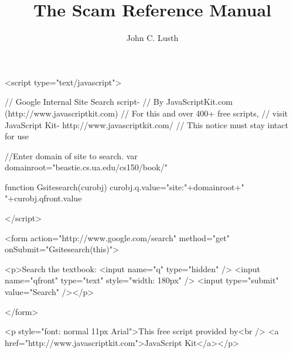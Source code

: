 \documentclass{book}
\title{The Scam Reference Manual}
\author{John C. Lusth}
\begin{document}
\maketitle

\W\htmlrule
\W{}
\W\htmlrule

\begin{rawxml}
<script type="text/javascript">

// Google Internal Site Search script-
// By JavaScriptKit.com (http://www.javascriptkit.com)
// For this and over 400+ free scripts,
// visit JavaScript Kit- http://www.javascriptkit.com/
// This notice must stay intact for use

//Enter domain of site to search.
var domainroot="beastie.cs.ua.edu/cs150/book/"

function Gsitesearch(curobj){
curobj.q.value="site:"+domainroot+" "+curobj.qfront.value
}

</script>


<form
    action="http://www.google.com/search"
    method="get" onSubmit="Gsitesearch(this)">

    <p>Search the textbook: 
    <input name="q" type="hidden" />
    <input name="qfront" type="text" style="width: 180px" />
    <input type="submit" value="Search" /></p>

    </form>

<p style="font: normal 11px Arial">This free script provided by<br />
<a href="http://www.javascriptkit.com">JavaScript Kit</a></p>
\end{rawxml}

\tableofcontents
\setcounter{tocdepth}{2} 



















%
%
%
%
\end{document}

